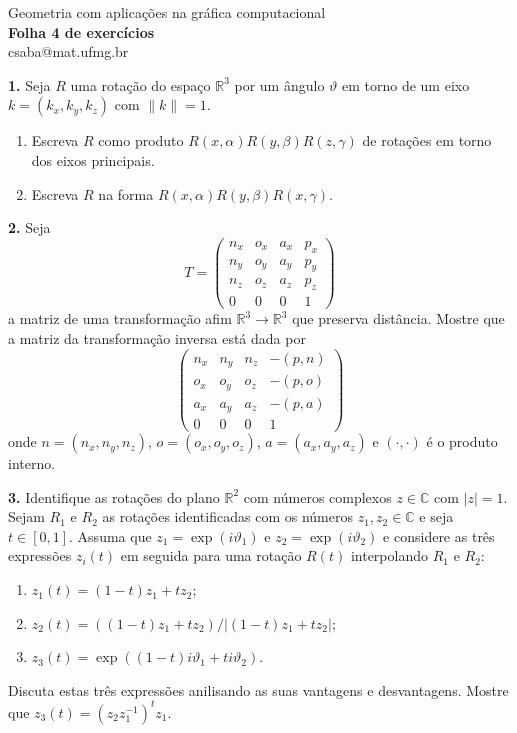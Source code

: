 \documentclass{amsart}
\newcommand{\R}{\mathbb R}
\newcommand{\C}{\mathbb C}
\begin{document}
\begin{center}
\large Geometria com aplicações na gráfica computacional\\
{\bf\large Folha 4 de exercícios}\\
csaba@mat.ufmg.br
\end{center}


\bigskip

{\bf 1.} Seja $R$ uma rotação do espaço $\R^3$ por um ângulo $\vartheta$ em torno de 
um eixo $k=(k_x,k_y,k_z)$ com $\|k\|=1$. 
\begin{enumerate}
    \item Escreva $R$ como produto $R(x,\alpha)R(y,\beta)R(z,\gamma)$ de rotações em torno dos eixos 
    principais. 
    \item Escreva $R$ na forma $R(x,\alpha)R(y,\beta)R(x,\gamma)$. 
\end{enumerate}

\medskip

{\bf 2.} Seja 
\[
    T=\begin{pmatrix} n_x & o_x & a_x & p_x \\ 
        n_y & o_y & a_y & p_y\\
        n_z & o_z & a_z & p_z \\
        0 & 0 & 0 & 1\end{pmatrix}
\]
a matriz de uma transformação afim $\R^3\to \R^3$ que preserva distância. 
Mostre que a matriz da transformação inversa está dada por 
\[
    \begin{pmatrix} n_x & n_y & n_z & -(p,n)\\
        o_x & o_y & o_z & -(p,o)\\
        a_x & a_y & a_z & -(p,a)\\
        0 & 0 & 0 & 1\end{pmatrix}
\]
onde $n=(n_x,n_y,n_z)$, $o=(o_x,o_y,o_z)$, $a=(a_x,a_y,a_z)$ e $(\cdot,\cdot)$ é o produto interno.

\medskip

{\bf 3.} Identifique as rotações do plano $\R^2$ com números complexos $z\in\C$ com $|z|=1$. 
Sejam $R_1$ e $R_2$ as rotações identificadas com os números $z_1,z_2\in\C$ e seja $t\in[0,1]$. 
Assuma que $z_1=\exp(i\vartheta_1)$ e $z_2=\exp(i\vartheta_2)$ e considere 
as três expressões $z_i(t)$ em seguida para uma rotação $R(t)$ interpolando $R_1$ e $R_2$:
\begin{enumerate}
    \item $z_1(t)=(1-t)z_1+tz_2$;
    \item $z_2(t)=  ((1-t)z_1+tz_2)/|(1-t)z_1+tz_2|$;
    \item $z_3(t)=\exp((1-t)i\vartheta_1+ti\vartheta_2)$.
\end{enumerate}
Discuta estas três expressões anilisando as suas vantagens e desvantagens. Mostre que $z_3(t)=(z_2z_1^{-1})^tz_1$.
\end{document}

